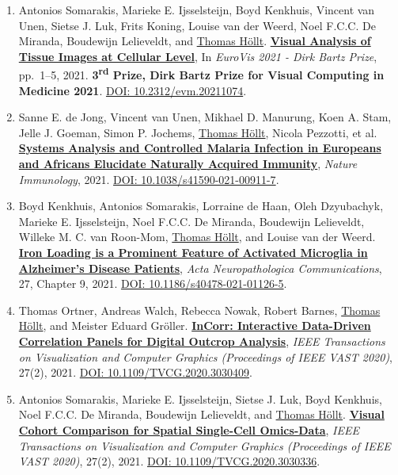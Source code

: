 \documentclass[10pt,a4paper,roman,final]{moderncv}
\newcommand*\highlightauthor[1]{\underline{#1}}
\begin{document}
\begin{enumerate}[leftmargin=0cm,start=2]
\item
Antonios Somarakis, Marieke E. Ijsselsteijn, Boyd Kenkhuis, Vincent van Unen, Sietse J. Luk, Frits Koning, Louise van der Weerd, Noel F.C.C. De Miranda, Boudewijn Lelieveldt, and \highlightauthor{Thomas Höllt}.
\href{https://www.thomashollt.com/publications/2021_dirk_bartz_prize/}{\textbf{Visual Analysis of Tissue Images at Cellular Level}},
In \emph{EuroVis 2021 - Dirk Bartz Prize}, pp.~1--5,
2021.
\textbf{3\textsuperscript{rd} Prize, Dirk Bartz Prize for Visual Computing in Medicine 2021}.
\href{https://doi.org/10.2312/evm.20211074}{DOI: 10.2312/\allowbreak evm.20211074}.


\item
Sanne E. de Jong, Vincent van Unen, Mikhael D. Manurung, Koen A. Stam, Jelle J. Goeman, Simon P. Jochems, \highlightauthor{Thomas Höllt}, Nicola Pezzotti, et al.
\href{https://www.thomashollt.com/publications/2021_nature_immunology/}{\textbf{Systems Analysis and Controlled Malaria Infection in Europeans and Africans Elucidate Naturally Acquired Immunity}},
\emph{Nature Immunology},
2021.
\href{https://doi.org/10.1038/s41590-021-00911-7}{DOI: 10.1038/\allowbreak s41590-021-00911-7}.


\item
Boyd Kenkhuis, Antonios Somarakis, Lorraine de Haan, Oleh Dzyubachyk, Marieke E. Ijsselsteijn, Noel F.C.C. De Miranda, Boudewijn Lelieveldt, Willeke M. C. van Roon-Mom, \highlightauthor{Thomas Höllt}, and Louise van der Weerd.
\href{https://www.thomashollt.com/publications/2021_acta_neuropathologica_communications/}{\textbf{Iron Loading is a Prominent Feature of Activated Microglia in Alzheimer’s Disease Patients}},
\emph{Acta Neuropathologica Communications}, 27, Chapter 9,
2021.
\href{https://doi.org/10.1186/s40478-021-01126-5}{DOI: 10.1186/\allowbreak s40478-021-01126-5}.


\item
Thomas Ortner, Andreas Walch, Rebecca Nowak, Robert Barnes, \highlightauthor{Thomas Höllt}, and Meister Eduard Gröller.
\href{https://www.thomashollt.com/publications/2020_vis_incorr/}{\textbf{InCorr: Interactive Data-Driven Correlation Panels for Digital Outcrop Analysis}},
\emph{IEEE Transactions on Visualization and Computer Graphics (Proceedings of IEEE VAST 2020)}, 27(2),
2021.
\href{https://doi.org/10.1109/TVCG.2020.3030409}{DOI: 10.1109/\allowbreak TVCG.2020.3030409}.


\item
Antonios Somarakis, Marieke E. Ijsselsteijn, Sietse J. Luk, Boyd Kenkhuis, Noel F.C.C. De Miranda, Boudewijn Lelieveldt, and \highlightauthor{Thomas Höllt}.
\href{https://www.thomashollt.com/publications/2020_vis_cohort/}{\textbf{Visual Cohort Comparison for Spatial Single-Cell Omics-Data}},
\emph{IEEE Transactions on Visualization and Computer Graphics (Proceedings of IEEE VAST 2020)}, 27(2),
2021.
\href{https://doi.org/10.1109/TVCG.2020.3030336}{DOI: 10.1109/\allowbreak TVCG.2020.3030336}.



\end{enumerate}
\end{document}
